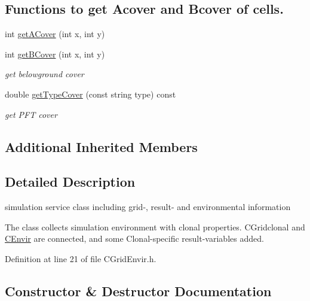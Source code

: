 \subsection*{Functions to get Acover and Bcover of cells.}
\begin{DoxyCompactItemize}
\item 
int \mbox{\hyperlink{class_c_grid_envir_a73e33cf0609fdd81d5b7e04ca7a02f12}{get\+A\+Cover}} (int x, int y)
\item 
int \mbox{\hyperlink{class_c_grid_envir_af90026b4979069e8b4aa262ffa124190}{get\+B\+Cover}} (int x, int y)
\begin{DoxyCompactList}\small\item\em get belowground cover \end{DoxyCompactList}\item 
double \mbox{\hyperlink{class_c_grid_envir_a9f8abae7df32c801895f3e7ff7f967cf}{get\+Type\+Cover}} (const string type) const
\begin{DoxyCompactList}\small\item\em get P\+FT cover \end{DoxyCompactList}\end{DoxyCompactItemize}
\subsection*{Additional Inherited Members}


\subsection{Detailed Description}
simulation service class including grid-\/, result-\/ and environmental information 

The class collects simulation environment with clonal properties. C\+Gridclonal and \mbox{\hyperlink{class_c_envir}{C\+Envir}} are connected, and some Clonal-\/specific result-\/variables added. 

Definition at line 21 of file C\+Grid\+Envir.\+h.



\subsection{Constructor \& Destructor Documentation}
\mbox{\label{class_c_grid_envir_ab3cf850b9fa815748dd555bd1704441d}} 
